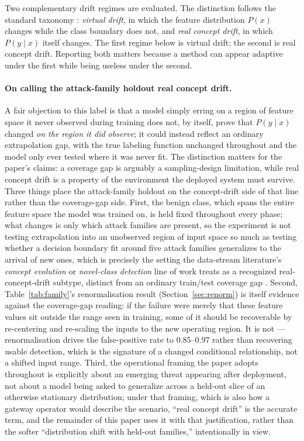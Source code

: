 \documentclass[11pt,a4paper]{article}
\begin{document}
Two complementary drift regimes are evaluated. The distinction follows the
standard taxonomy \cite{gama2014}: \emph{virtual drift}, in which the feature
distribution $P(x)$ changes while the class boundary does not, and \emph{real
concept drift}, in which $P(y\mid x)$ itself changes. The first regime below is
virtual drift; the second is real concept drift. Reporting both matters because
a method can appear adaptive under the first while being useless under the
second.

\paragraph{On calling the attack-family holdout real concept drift.} A fair
objection to this label is that a model simply erring on a region of feature
space it never observed during training does not, by itself, prove that
$P(y\mid x)$ changed \emph{on the region it did observe}; it could instead
reflect an ordinary extrapolation gap, with the true labeling function
unchanged throughout and the model only ever tested where it was never fit.
The distinction matters for the paper's claims: a coverage gap is arguably a
sampling-design limitation, while real concept drift is a property of the
environment the deployed system must survive. Three things place the
attack-family holdout on the concept-drift side of that line rather than the
coverage-gap side. First, the benign class, which spans the entire feature
space the model was trained on, is held fixed throughout every phase; what
changes is only which attack families are present, so the experiment is not
testing extrapolation into an unobserved region of input space so much as
testing whether a decision boundary fit around five attack families
generalizes to the arrival of new ones, which is precisely the setting the
data-stream literature's \emph{concept evolution} or \emph{novel-class
detection} line of work treats as a recognized real-concept-drift subtype,
distinct from an ordinary train/test coverage gap \cite{masud2011}. Second,
Table~\ref{tab:family}'s renormalisation result (Section~\ref{sec:renorm})
is itself evidence against the coverage-gap reading: if the failure were
merely that these feature values sit outside the range seen in training, some
of it should be recoverable by re-centering and re-scaling the inputs to the
new operating region. It is not --- renormalisation drives the false-positive
rate to 0.85--0.97 rather than recovering usable detection, which is the
signature of a changed conditional relationship, not a shifted input range.
Third, the operational framing the paper adopts throughout is explicitly
about an emerging threat appearing after deployment, not about a model being
asked to generalize across a held-out slice of an otherwise stationary
distribution; under that framing, which is also how a gateway operator would
describe the scenario, ``real concept drift'' is the accurate term, and the
remainder of this paper uses it with that justification, rather than the
softer ``distribution shift with held-out families,'' intentionally in view.
\end{document}
